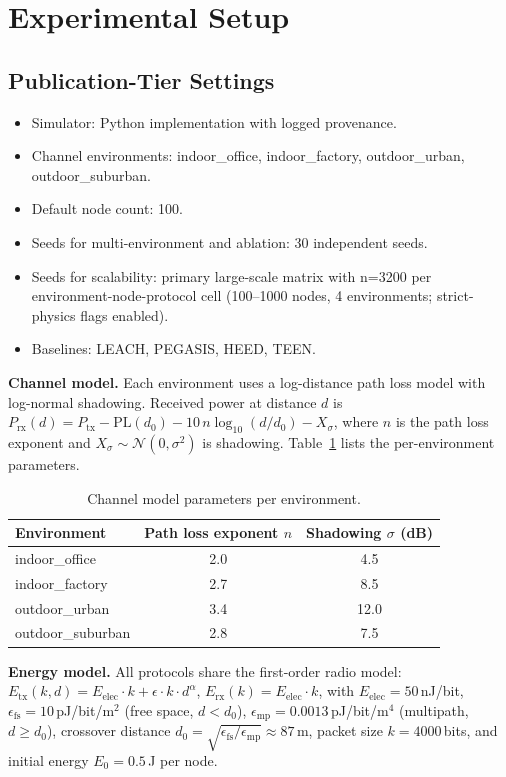 ﻿\documentclass[sensors,article,submit,moreauthors,pdftex]{Definitions/mdpi}
\begin{document}
\section{Experimental Setup}
\subsection{Publication-Tier Settings}
\begin{itemize}
\item Simulator: Python implementation with logged provenance.
\item Channel environments: indoor\_office, indoor\_factory, outdoor\_urban, outdoor\_suburban.
\item Default node count: 100.
\item Seeds for multi-environment and ablation: 30 independent seeds.
\item Seeds for scalability: primary large-scale matrix with n=3200 per environment-node-protocol cell (100--1000 nodes, 4 environments; strict-physics flags enabled).
\item Baselines: LEACH, PEGASIS, HEED, TEEN.
\end{itemize}

\noindent\textbf{Channel model.}
Each environment uses a log-distance path loss model with log-normal shadowing.
Received power at distance $d$ is
$P_{\mathrm{rx}}(d) = P_{\mathrm{tx}} - \mathrm{PL}(d_0) - 10\,n\log_{10}(d/d_0) - X_\sigma$,
where $n$ is the path loss exponent and $X_\sigma \sim \mathcal{N}(0,\sigma^2)$ is shadowing.
Table~\ref{tab:channel_params} lists the per-environment parameters.

\begin{table}[H]
\caption{Channel model parameters per environment.}
\label{tab:channel_params}
\centering
\begin{tabular}{lcc}
\toprule
Environment & Path loss exponent $n$ & Shadowing $\sigma$ (dB) \\
\midrule
indoor\_office    & 2.0 & 4.5 \\
indoor\_factory   & 2.7 & 8.5 \\
outdoor\_urban    & 3.4 & 12.0 \\
outdoor\_suburban & 2.8 & 7.5 \\
\bottomrule
\end{tabular}
\end{table}

\noindent\textbf{Energy model.}
All protocols share the first-order radio model:
$E_{\mathrm{tx}}(k,d)=E_{\mathrm{elec}}\cdot k + \epsilon \cdot k \cdot d^{\alpha}$,
$E_{\mathrm{rx}}(k)=E_{\mathrm{elec}}\cdot k$,
with $E_{\mathrm{elec}}=50$\,nJ/bit, $\epsilon_{\mathrm{fs}}=10$\,pJ/bit/m$^2$ (free space, $d<d_0$),
$\epsilon_{\mathrm{mp}}=0.0013$\,pJ/bit/m$^4$ (multipath, $d\geq d_0$),
crossover distance $d_0=\sqrt{\epsilon_{\mathrm{fs}}/\epsilon_{\mathrm{mp}}}\approx87$\,m, packet size $k=4000$\,bits, and initial energy $E_0=0.5$\,J per node.
\end{document}
